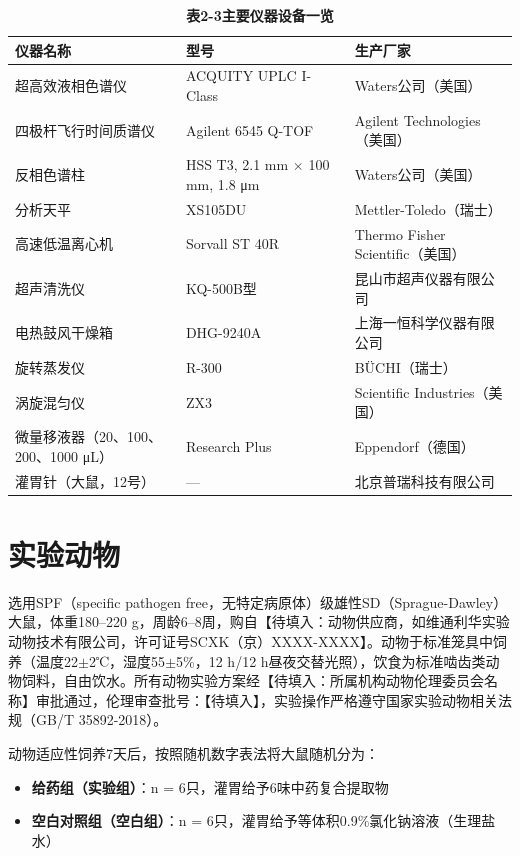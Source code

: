 \documentclass[12pt,a4paper,UTF8,openany]{ctexbook}
\begin{document}
\begin{table}[H]
\centering
\caption{\textbf{表2-3\enspace 主要仪器设备一览}}
\label{tab:instruments}
\small
\begin{tabularx}{\textwidth}{>{\raggedright\arraybackslash}p{4.0cm} >{\raggedright\arraybackslash}p{3.0cm} >{\raggedright\arraybackslash}X}
\toprule
\textbf{仪器名称} & \textbf{型号} & \textbf{生产厂家} \\
\midrule
超高效液相色谱仪 & ACQUITY UPLC I-Class & Waters公司（美国）\\
四极杆飞行时间质谱仪 & Agilent 6545 Q-TOF & Agilent Technologies（美国）\\
反相色谱柱 & HSS T3, 2.1 mm $\times$ 100 mm, 1.8 μm & Waters公司（美国）\\
分析天平 & XS105DU & Mettler-Toledo（瑞士）\\
高速低温离心机 & Sorvall ST 40R & Thermo Fisher Scientific（美国）\\
超声清洗仪 & KQ-500B型 & 昆山市超声仪器有限公司 \\
电热鼓风干燥箱 & DHG-9240A & 上海一恒科学仪器有限公司 \\
旋转蒸发仪 & R-300 & BÜCHI（瑞士）\\
涡旋混匀仪 & ZX3 & Scientific Industries（美国）\\
微量移液器（20、100、200、1000 μL）& Research Plus & Eppendorf（德国）\\
灌胃针（大鼠，12号） & --- & 北京普瑞科技有限公司 \\
\bottomrule
\end{tabularx}
\end{table}

\section{实验动物}

选用SPF（specific pathogen free，无特定病原体）级雄性SD（Sprague-Dawley）大鼠，体重180--220 g，周龄6--8周，购自【待填入：动物供应商，如维通利华实验动物技术有限公司，许可证号SCXK（京）XXXX-XXXX】。动物于标准笼具中饲养（温度22$\pm$2℃，湿度55$\pm$5\%，12 h/12 h昼夜交替光照），饮食为标准啮齿类动物饲料，自由饮水。所有动物实验方案经【待填入：所属机构动物伦理委员会名称】审批通过，伦理审查批号：【待填入】，实验操作严格遵守国家实验动物相关法规（GB/T 35892-2018）。

动物适应性饲养7天后，按照随机数字表法将大鼠随机分为：
\begin{itemize}
  \item \textbf{给药组（实验组）}：n = 6只，灌胃给予6味中药复合提取物
  \item \textbf{空白对照组（空白组）}：n = 6只，灌胃给予等体积0.9\%氯化钠溶液（生理盐水）
\end{itemize}
\end{document}

